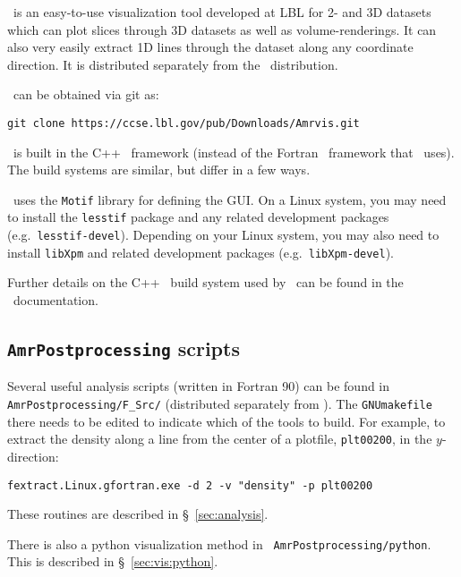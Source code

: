 \amrvis\ is an easy-to-use visualization tool developed at LBL for
2- and 3D datasets which can plot slices through 3D datasets as well
as volume-renderings.  It can also very easily extract 1D lines
through the dataset along any coordinate direction.  It is distributed
separately from the \maestro\ distribution.

\amrvis\ can be obtained via git as:
\begin{verbatim}
git clone https://ccse.lbl.gov/pub/Downloads/Amrvis.git
\end{verbatim}
\amrvis\ is built in the C++ \boxlib\ framework (instead of the Fortran 
\boxlib\ framework that \maestro\ uses).  The build systems are similar,
but differ in a few ways.  

\amrvis\ uses the {\tt Motif} library for defining the GUI.  On a Linux 
system, you may need to install the {\tt lesstif} package and any
related development packages (e.g.\ {\tt lesstif-devel}).  Depending
on your Linux system, you may also need to install {\tt libXpm} and
related development packages (e.g.\ {\tt libXpm-devel}).  

Further details on the C++ \boxlib\ build system used by \amrvis\
can be found in the \boxlib\ documentation.


\subsection{{\tt AmrPostprocessing} scripts}

Several useful analysis scripts (written in Fortran 90) can be found
in {\tt AmrPostprocessing/F\_Src/} (distributed separately
from \maestro).  The {\tt GNUmakefile} there needs to be edited to
indicate which of the tools to build.  For example, to extract the
density along a line from the center of a plotfile, {\tt plt00200}, in
the $y$-direction:

\begin{verbatim}
fextract.Linux.gfortran.exe -d 2 -v "density" -p plt00200
\end{verbatim}

These routines are described in \S~\ref{sec:analysis}.

There is also a python visualization method in {\tt
AmrPostprocessing/python}.  This is described
in \S~\ref{sec:vis:python}.


\subsection{\visit}

